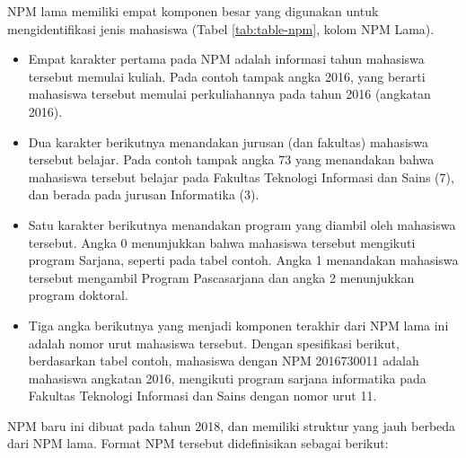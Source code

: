     NPM lama memiliki empat komponen besar yang digunakan untuk mengidentifikasi
    jenis mahasiswa (Tabel \ref{tab:table-npm}, kolom NPM Lama). 
    \begin{itemize}
        \item Empat karakter pertama pada NPM adalah informasi tahun mahasiswa
        tersebut memulai kuliah. Pada contoh tampak angka 2016, yang berarti
        mahasiswa tersebut memulai perkuliahannya pada tahun 2016 (angkatan 2016). 
        
        \item Dua karakter berikutnya menandakan jurusan (dan fakultas) mahasiswa
        tersebut belajar. Pada contoh tampak angka 73 yang menandakan bahwa
        mahasiswa tersebut belajar pada Fakultas Teknologi Informasi dan Sains (7),
        dan berada pada jurusan Informatika (3). 
        
        \item Satu karakter berikutnya menandakan program yang diambil oleh
        mahasiswa tersebut. Angka 0 menunjukkan bahwa mahasiswa tersebut mengikuti
        program Sarjana, seperti pada tabel contoh. Angka 1 menandakan mahasiswa
        tersebut mengambil Program Pascasarjana dan angka 2 menunjukkan program
        doktoral. 
        
        \item Tiga angka berikutnya yang menjadi komponen terakhir dari NPM lama ini
        adalah nomor urut mahasiswa tersebut. Dengan spesifikasi berikut,
        berdasarkan tabel contoh, mahasiswa dengan NPM 2016730011 adalah mahasiswa
        angkatan 2016, mengikuti program sarjana informatika pada Fakultas Teknologi
        Informasi dan Sains dengan nomor urut 11.
    \end{itemize}
    
    NPM baru ini dibuat pada tahun 2018, dan memiliki struktur yang jauh berbeda
    dari NPM lama. Format NPM tersebut didefinisikan sebagai berikut:
    
